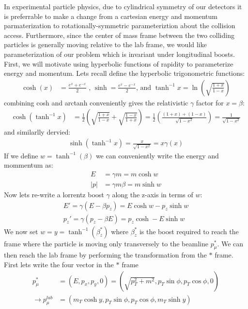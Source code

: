 In experimental particle physics, due to cylindrical symmetry of our detectors it is preferrable to make a change
from a cartesian energy and momentum parmaterization to  rotationally-symmetric parameteriztion about
the collision access. Furthermore, since the center of mass frame between the two colliding particles is generally moving
relative to the lab frame, we would like parameterization of our problem which is invariant under longitudinal boosts. First, 
we will motivate using hyperbolic functions of rapidity to parameterize energy and momentum. Lets recall define the hyperbolic
trigonometric functions:
\begin{align*}
\cosh(x) &= \frac{e^{x} + e^{-x}}{2} \texttt{ , } \sinh = \frac{e^{x} - e^{-x}}{2} \text{, and }\tanh^{-1}x = \ln \left( \sqrt{\frac{1+x}{1-x}} \right)
\end{align*}
combining cosh and arctanh conveniently gives the relativistic $\gamma$ factor for $x=\beta$:
\begin{align*}
\cosh{(\tanh^{-1}{x})} &= \frac{1}{2} \left ( \sqrt{\frac{1+x}{1-x}} + \sqrt{\frac{1-x}{1+x}} \right ) = \frac{1}{2} \left( \frac{(1+x) + (1 -x)}{\sqrt{1-x^2}} \right)  = \frac{1}{\sqrt{1-x^2}}
\end{align*}
and similarlly dervied:
\begin{align*}
\sinh{(\tanh^{-1}{x})} = \frac{x}{\sqrt{1-x^2}} = x \gamma(x)
\end{align*}
If we define $w = \tanh^{-1}(\beta)$ we can conveniently write the energy and mommentum as:
\begin{align*}
E &= \gamma m = m \cosh{w} \\
|p| &= \gamma m \beta  = m \sinh{w} 
\end{align*}
Now lets re-write a lorrentz boost $\gamma$ along the z-axis in terms of $w$:
\begin{align*} \label{eq:boost}
E' = \gamma (E - \beta p_z)   = E \cosh w - p_z \sinh w \\
p_z' = \gamma (p_z - \beta E) = p_z \cosh - E \sinh w
\end{align*}
We now set $w = y = \tanh^{-1}(\beta_z^*)$ where $\beta_z^*$ is the boost required to reach the frame where the particle is
moving only transversely to the beamline $p_\mu^*$. We can then reach the lab frame by performing
 the transformation from the $*$ frame. First lets write the four vector in the $*$ frame
\begin{align*}
 p_\mu^* &= ( E , p_x, p_y, 0 ) = (\sqrt{p_T^2 + m^2}, p_T\sin \phi, p_T \cos \phi, 0)\\
\rightarrow  p_\mu^{lab} &= (m_T \cosh y, p_T \sin \phi, p_T \cos \phi, m_T \sinh y)
\end{align*}
